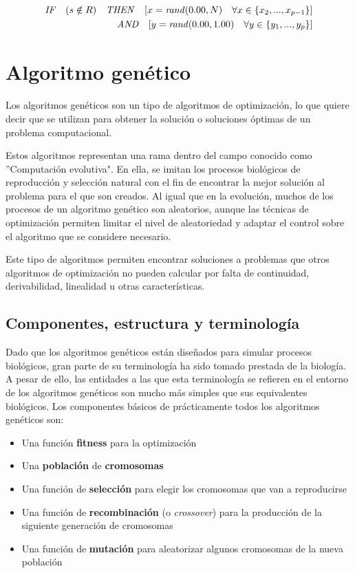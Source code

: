 \begin{equation} \label{eq:transferEQ}
	\begin{aligned}
	 \text{\textit{IF}} \quad (s \notin R) \quad \text{\textit{THEN}} \quad [x= \text{\textit{rand}}(0.00, N) \quad \forall x \in \left \{ x_{2},...,x_{p-1} \right \}]& \\
	 \qquad \qquad \qquad \,\quad  \text{\textit{AND}} \quad [y= \text{\textit{rand}}(0.00, 1.00) \quad \forall y \in \left \{ y_{1},...,y_{p} \right \}]& \\
 \end{aligned}
\end{equation}


\section{Algoritmo genético}
Los algoritmos genéticos son un tipo de algoritmos de optimización, lo que quiere decir que se utilizan para
obtener la solución o soluciones óptimas de un problema computacional\cite{JennaCarr}.

Estos algoritmos representan una rama dentro del campo conocido como ''Computación evolutiva". En ella, se
imitan los procesos biológicos de reproducción y selección natural con el fin de encontrar la mejor solución al
problema para el que son creados. Al igual que en la evolución, muchos de los procesos de un algoritmo genético son
aleatorios, aunque las técnicas de optimización permiten limitar el nivel de aleatoriedad y adaptar el control sobre
el algoritmo que se considere necesario.

Este tipo de algoritmos permiten encontrar soluciones a problemas que otros algoritmos de optimización no pueden calcular
por falta de continuidad, derivabilidad, linealidad u otras características.

\subsection{Componentes, estructura y terminología}
Dado que los algoritmos genéticos están diseñados para simular procesos biológicos, gran parte de su terminología ha sido tomado
prestada de la biología. A pesar de ello, las entidades a las que esta terminología se refieren en el entorno de los algoritmos genéticos
son mucho más simples que sus equivalentes biológicos. Los componentes básicos de prácticamente todos los algoritmos genéticos son:

\begin{itemize}
	\item{Una función \textbf{fitness} para la optimización}
	\item{Una \textbf{población} de \textbf{cromosomas}}
	\item{Una función de \textbf{selección} para elegir los cromosomas que van a reproducirse}
	\item{Una función de \textbf{recombinación} (o \textit{crossover}) para la producción de la siguiente generación de cromosomas}
	\item{Una función de \textbf{mutación} para aleatorizar algunos cromosomas de la nueva población}
\end{itemize}

